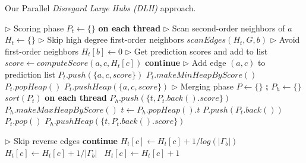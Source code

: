 \begin{algorithm}[hbtp]
\caption{Our Parallel \textit{Disregard Large Hubs (DLH)} approach.}
\label{alg:predict}
\begin{algorithmic}[1]

\Statex

 \label{alg:predict--begin}
  \State $\rhd$ Scoring phase
  \State $P_t \gets \{\}$ \textbf{on each thread} \label{alg:predict--scoring-begin}
    \State $\rhd$ Scan second-order neighbors of $a$
    \State $H_t \gets \{\}$
      \State $\rhd$ Skip high degree first-order neighbors
       $scanEdges(H_t, G, b)$
      \EndIf
    \EndFor
    \State $\rhd$ Avoid first-order neighbors
     $H_t[b] \gets 0$ \label{alg:predict--avoid-neighbors1}
    \EndFor
    \State $\rhd$ Get prediction scores and add to list
      \State $score \gets computeScore(a, c, H_t[c])$
       \textbf{continue}
      \EndIf
      \State $\rhd$ Add edge $(a, c)$ to prediction list
        \State $P_t.push(\{a, c, score\})$
         $P_t.makeMinHeapByScore()$
        \EndIf
        \State $P_t.popHeap()$
        \State $P_t.pushHeap(\{a, c, score\})$
      \EndIf
    \EndFor
  \EndFor \label{alg:predict--scoring-end}
  \State $\rhd$ Merging phase \label{alg:predict--merging-begin}
  \State $P \gets \{\}$ \textbf{;} $P_h \gets \{\}$
  \State $sort(P_t)$ \textbf{on each thread}
     $P_h.push(\{t, P_t.back().score\})$
    \EndIf
  \EndFor
  \State $P_h.makeMaxHeapByScore()$ 
   \label{alg:predict--merge-loop-begin}
    \State $t \gets P_h.popHeap().t$
    \State $P.push(P_t.back())$
    \State $P_t.pop()$
     $P_h.pushHeap(\{t, P_t.back().score\})$
    \EndIf
  \EndWhile \label{alg:predict--merging-end}
\EndFunction \label{alg:predict--end}

\Statex

 \label{alg:predict--scan-begin}
    \State $\rhd$ Skip reverse edges
     \textbf{continue}
    \EndIf
     $H_t[c] \gets H_t[c] + 1 / log(|\Gamma_b|)$
     $H_t[c] \gets H_t[c] + 1 / |\Gamma_b|$
    \Else\ $H_t[c] \gets H_t[c] + 1$
    \EndIf
  \EndFor
\EndFunction \label{alg:predict--scan-end}
\end{algorithmic}
\end{algorithm}
